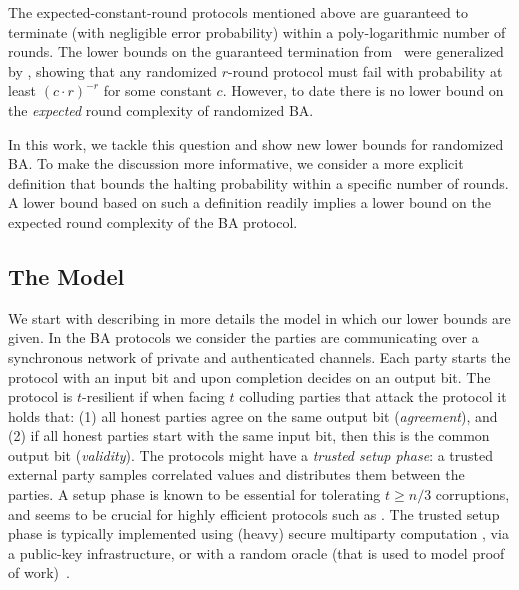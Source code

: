 The expected-constant-round protocols mentioned above are guaranteed to terminate (with negligible error probability) within a poly-logarithmic number of rounds.
The lower bounds on the guaranteed termination from~\cite{FL82,DS83} were generalized by \cite{CMS89,KY86}, showing that any randomized $r$-round protocol must fail with probability at least $(c\cdot r)^{-r}$ for some constant $c$. However, to date there is no lower bound on the \emph{expected} round complexity of randomized BA.

In this work, we tackle this question and show new lower bounds for randomized BA. To make the discussion more informative, we consider a more explicit definition that bounds the halting probability within a specific number of rounds. A lower bound based on such a definition readily implies a lower bound on the expected round complexity of the BA protocol.

\subsection{The Model}\label{sec:intro:model}
We start with   describing in more details the model in which our lower bounds are given.  In the BA protocols we consider the  parties are communicating over a synchronous network of private and authenticated channels. Each party starts the protocol with an input bit and upon completion decides on an output bit. The protocol is  $t$-resilient  if  when  facing $t$ colluding parties that attack the protocol it holds that: (1) all honest parties agree on the same output bit (\emph{agreement}), and (2) if all honest parties start with the same input bit, then this is the common output bit (\emph{validity}). The protocols might have a \emph{trusted setup phase}: a trusted external party samples correlated values and distributes them between the parties. A setup phase is known to be essential for tolerating $t\geq n/3$ corruptions, and seems to be crucial for highly efficient protocols such as \cite{Micali17,SM16,MV17,ADDNR19,ACDNPRS19}. The trusted setup phase is typically implemented using (heavy) secure multiparty computation \cite{BCGTV15,BGG18}, via a public-key infrastructure, or with a random oracle (that is used to model proof of work)~\cite{PS17}. 




